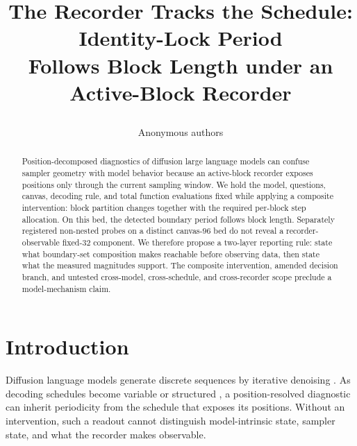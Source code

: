 \documentclass{article}
\title{\raggedright The Recorder Tracks the Schedule: Identity-Lock Period \\
Follows Block Length under an Active-Block Recorder}
\author{Anonymous authors}
\date{}
\begin{document}
\maketitle
\ificlrfinal
\else
\fi
\pagestyle{fancy}
\thispagestyle{fancy}

\begin{abstract}
Position-decomposed diagnostics of diffusion large language models can confuse
sampler geometry with model behavior because an active-block recorder exposes
positions only through the current sampling window.  We hold the model,
questions, canvas, decoding rule, and total function evaluations fixed while
applying a composite intervention: block partition changes together with the
required per-block step allocation.  On this bed, the detected boundary period
follows block length.  Separately registered non-nested probes on a distinct
canvas-$96$ bed do not reveal a recorder-observable fixed-$32$ component.  We
therefore propose a two-layer reporting rule: state what boundary-set
composition makes reachable before observing data, then state what the measured
magnitudes support.  The composite intervention, amended decision branch, and
untested cross-model, cross-schedule, and cross-recorder scope preclude a
model-mechanism claim.
\end{abstract}

\section{Introduction}\label{sec:intro}

Diffusion language models generate discrete sequences by iterative denoising
\citep{austin2021structured,zheng2023reparameterized,lou2024discrete,shi2024simplified,nie2025large}.
As decoding schedules become variable or structured
\citep{li2025beyond,sun2026dystruct,wang2026reversible}, a position-resolved
diagnostic can inherit periodicity from the schedule that exposes its positions.
Without an intervention, such a readout cannot distinguish model-intrinsic state,
sampler state, and what the recorder makes observable.
\end{document}
